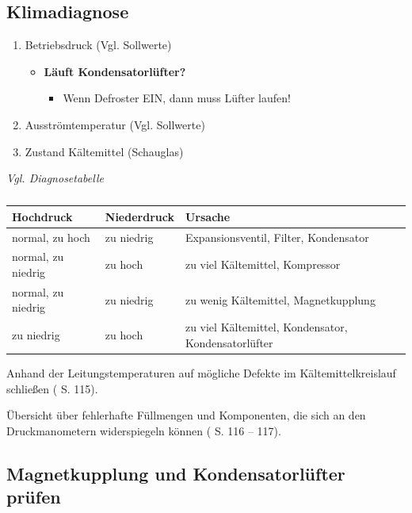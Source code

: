 \subsection{Klimadiagnose}\label{klimadiagnose}

\begin{enumerate}
\item
  Betriebsdruck (Vgl. Sollwerte)

  \begin{itemize}
  \item
    \textbf{Läuft Kondensatorlüfter?}

    \begin{itemize}
    \item
      Wenn Defroster EIN, dann muss Lüfter laufen!
    \end{itemize}
  \end{itemize}
\item
  Ausströmtemperatur (Vgl. Sollwerte)
\item
  Zustand Kältemittel (Schauglas)
\end{enumerate}

\emph{Vgl. Diagnosetabelle}

\begin{table}[!ht]%
\centering 
	\caption{}%
\begin{tabular}{@{}lll@{}}
\hline
\textbf{Hochdruck} & \textbf{Niederdruck} & \textbf{Ursache} \\
\hline
normal, zu hoch & zu niedrig & Expansionsventil, Filter, Kondensator \\
normal, zu niedrig & zu hoch & zu viel Kältemittel, Kompressor \\
normal, zu niedrig & zu niedrig & zu wenig Kältemittel,
Magnetkupplung \\
zu niedrig & zu hoch & zu viel Kältemittel, Kondensator,
Kondensatorlüfter \\
\hline
\end{tabular} 
\end{table}

Anhand der Leitungstemperaturen auf mögliche Defekte im
Kältemittelkreislauf schließen (\textcite{schmidt:2015:klima} S. 115).

Übersicht über fehlerhafte Füllmengen und Komponenten, die sich an den
Druckmanometern widerspiegeln können (\textcite{schmidt:2015:klima} S. 116
-- 117).

\subsection{Magnetkupplung und Kondensatorlüfter
prüfen}\label{magnetkupplung-und-kondensatorluefter-pruefen}

